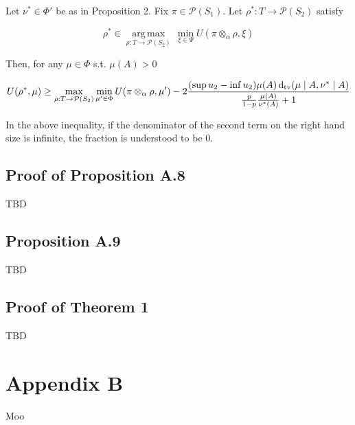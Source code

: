 \documentclass[a4paper]{article}
\newcommand{\Dtv}{\operatorname{d}_{\textnormal{tv}}}
\newcommand{\Argmax}[1]{\underset{#1}{\operatorname{arg\,max}}\,}
\newcommand{\Prob}{\mathcal{P}}
\begin{document}
Let ${\nu^* \in \Phi'}$ be as in Proposition 2. Fix ${\pi \in \Prob(S_1)}$.  Let ${\rho^*: T \rightarrow \Prob(S_2)}$ satisfy

$$\rho^* \in \Argmax{\rho: T \rightarrow \Prob(S_2)} \min_{\xi \in \Psi} U(\pi \otimes_\alpha \rho, \xi)$$

Then, for any ${\mu \in \Phi}$ s.t. ${\mu(A) > 0}$

$$U(\rho^*,\mu) \geq \max_{\rho: T \rightarrow \Prob(S_2)} \min_{\mu' \in \Phi} U(\pi \otimes_\alpha \rho, \mu')-2\frac{(\sup u_2 - \inf u_2)\mu(A)\Dtv(\mu \mid A, \nu^* \mid A)}{\frac{p}{1-p}\frac{\mu(A)}{\nu^*(A)}+1}$$

In the above inequality, if the denominator of the second term on the right hand size is infinite, the fraction is understood to be 0.

\subsection{Proof of Proposition A.8}

TBD

\subsection{Proposition A.9}

TBD

\subsection{Proof of Theorem 1}

TBD

\section{Appendix B}

Moo
\end{document}
